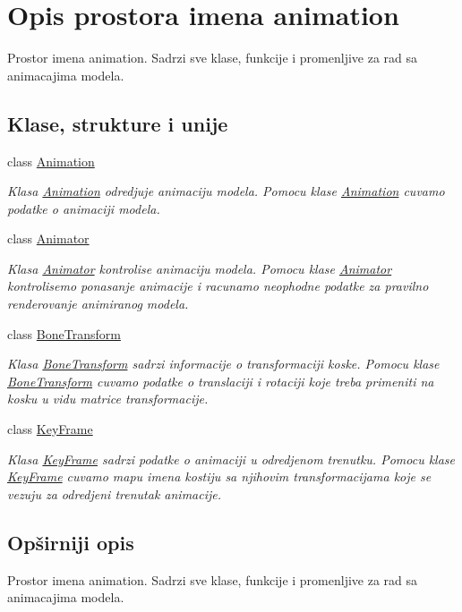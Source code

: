 \hypertarget{namespaceanimation}{}\section{Opis prostora imena animation}
\label{namespaceanimation}


Prostor imena animation. Sadrzi sve klase, funkcije i promenljive za rad sa animacajima modela.  


\subsection*{Klase, strukture i unije}
\begin{DoxyCompactItemize}
\item 
class \hyperlink{classanimation_1_1Animation}{Animation}
\begin{DoxyCompactList}\small\item\em Klasa \hyperlink{classanimation_1_1Animation}{Animation} odredjuje animaciju modela. Pomocu klase \hyperlink{classanimation_1_1Animation}{Animation} cuvamo podatke o animaciji modela. \end{DoxyCompactList}\item 
class \hyperlink{classanimation_1_1Animator}{Animator}
\begin{DoxyCompactList}\small\item\em Klasa \hyperlink{classanimation_1_1Animator}{Animator} kontrolise animaciju modela. Pomocu klase \hyperlink{classanimation_1_1Animator}{Animator} kontrolisemo ponasanje animacije i racunamo neophodne podatke za pravilno renderovanje animiranog modela. \end{DoxyCompactList}\item 
class \hyperlink{classanimation_1_1BoneTransform}{Bone\+Transform}
\begin{DoxyCompactList}\small\item\em Klasa \hyperlink{classanimation_1_1BoneTransform}{Bone\+Transform} sadrzi informacije o transformaciji koske. Pomocu klase \hyperlink{classanimation_1_1BoneTransform}{Bone\+Transform} cuvamo podatke o translaciji i rotaciji koje treba primeniti na kosku u vidu matrice transformacije. \end{DoxyCompactList}\item 
class \hyperlink{classanimation_1_1KeyFrame}{Key\+Frame}
\begin{DoxyCompactList}\small\item\em Klasa \hyperlink{classanimation_1_1KeyFrame}{Key\+Frame} sadrzi podatke o animaciji u odredjenom trenutku. Pomocu klase \hyperlink{classanimation_1_1KeyFrame}{Key\+Frame} cuvamo mapu imena kostiju sa njihovim transformacijama koje se vezuju za odredjeni trenutak animacije. \end{DoxyCompactList}\end{DoxyCompactItemize}


\subsection{Opširniji opis}
Prostor imena animation. Sadrzi sve klase, funkcije i promenljive za rad sa animacajima modela. 